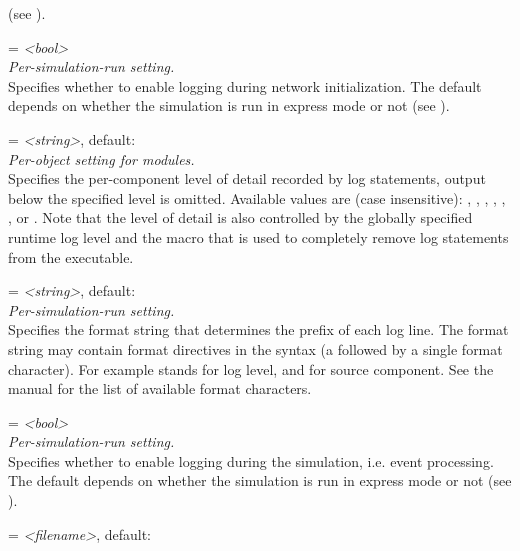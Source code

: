 \begin{description}
    (see ).
\item[cmdenv-log-initialization] = \textit{<bool>}\\
    \textit{Per-simulation-run setting.}\\
    Specifies whether to enable logging during network initialization. The
    default depends on whether the simulation is run in express mode or not
    (see ).
\item[**.cmdenv-log-level] = \textit{<string>}, default: \\
    \textit{Per-object setting for modules.}\\
    Specifies the per-component level of detail recorded by log statements,
    output below the specified level is omitted. Available values are (case
    insensitive): , , , , ,
    ,  or . Note that the level of detail is
    also controlled by the globally specified runtime log level and the
     macro that is used to completely remove log
    statements from the executable.
\item[cmdenv-log-prefix] = \textit{<string>}, default: \ttt{[\%l]	}\\
    \textit{Per-simulation-run setting.}\\
    Specifies the format string that determines the prefix of each log line.
    The format string may contain format directives in the syntax  (a
    \ttt{\%} followed by a single format character).  For example 
    stands for log level, and  for source component. See the manual
    for the list of available format characters.
\item[cmdenv-log-simulation] = \textit{<bool>}\\
    \textit{Per-simulation-run setting.}\\
    Specifies whether to enable logging during the simulation, i.e. event
    processing. The default depends on whether the simulation is run in express
    mode or not (see ).
\item[cmdenv-output-file] = \textit{<filename>}, default: \\

\end{description}
